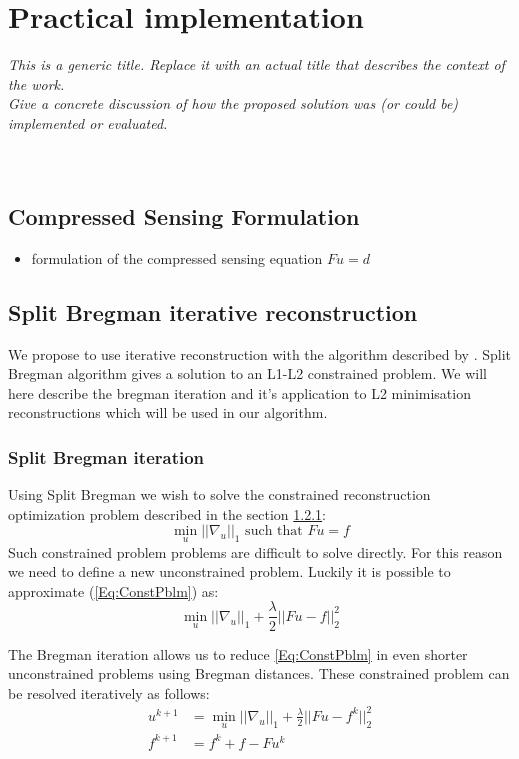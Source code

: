\chapter{Practical implementation }
\textit{This is a generic title. Replace it with an actual title that describes the context of the work.\\
Give a concrete discussion of how the proposed solution was (or could be) implemented or evaluated.}\\
\\
\\

\section{Compressed Sensing Formulation}
\begin{itemize}
	\item formulation of the compressed sensing equation $Fu=d$
\end{itemize}

\section{Split Bregman iterative reconstruction}
We propose to use iterative reconstruction with the algorithm described by \cite{goldstein2009split}. Split Bregman algorithm gives a solution to an L1-L2 constrained problem. We will here describe the bregman iteration and it's application to L2 minimisation reconstructions which will be used in our algorithm.
    \subsection{Split Bregman iteration}
    Using Split Bregman we wish to solve the constrained reconstruction optimization problem described in the section \ref{}:
    \begin{equation}
        \min\limits_{u}||\nabla_u||_1 \mbox{ such that } Fu=f
        \label{Eq:ConstPblm}
    \end{equation}
 Such constrained problem problems are difficult to solve directly. For this reason we need to define a new unconstrained problem. Luckily it is possible to approximate (\ref{Eq:ConstPblm}) as:
    \begin{equation}
        \min_{u}||\nabla_u||_1 + \frac{\lambda}{2}||Fu-f||_2^2
    \end{equation}
    
    The Bregman iteration allows us to reduce \ref{Eq:ConstPblm} in even shorter unconstrained problems using Bregman distances. These constrained problem can be resolved iteratively as follows:
    \begin{equation}
        \begin{aligned}
            u^{k+1} &= \min_{u} ||\nabla_u||_1 + \frac{\lambda}{2}||Fu - f^k||_2^2 \\
           f^{k+1} &= f^k + f - Fu^k
        \end{aligned}
    \end{equation}
